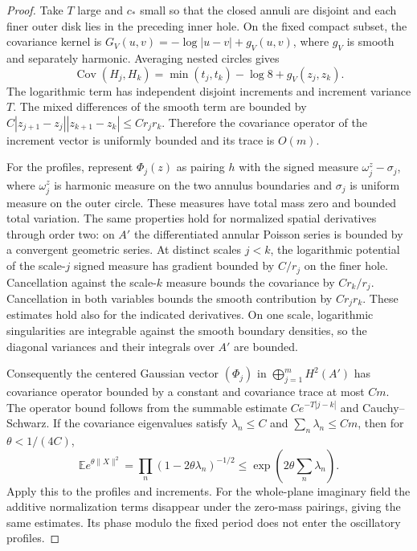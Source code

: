 \begin{proof}
Take $T$ large and $c_*$ small so that the closed annuli are disjoint and
each finer outer disk lies in the preceding inner hole.  On the fixed
compact subset, the covariance kernel is
$G_V(u,v)=-\log|u-v|+g_V(u,v)$, where $g_V$ is smooth and separately
harmonic.  Averaging nested circles gives
\[
 \operatorname{Cov}(H_j,H_k)
   =\min(t_j,t_k)-\log 8+g_V(z_j,z_k).
\]
The logarithmic term has independent disjoint increments and increment
variance $T$.  The mixed differences of the smooth term are bounded by
$C|z_{j+1}-z_j||z_{k+1}-z_k|\leq Cr_jr_k$.  Therefore the covariance
operator of the increment vector is uniformly bounded and its trace is
$O(m)$.

For the profiles, represent $\Phi_j(z)$ as pairing $h$ with the signed
measure $\omega_j^z-\sigma_j$, where $\omega_j^z$ is harmonic measure
on the two annulus boundaries and $\sigma_j$ is uniform measure on the
outer circle.  These measures have total mass zero and bounded total
variation.  The same properties hold for normalized spatial derivatives
through order two: on $A'$ the differentiated annular Poisson series is
bounded by a convergent geometric series.  At distinct scales $j<k$,
the logarithmic potential of the scale-$j$ signed measure has gradient
bounded by $C/r_j$ on the finer hole.  Cancellation against the scale-$k$
measure bounds the covariance by $Cr_k/r_j$.  Cancellation in both
variables bounds the smooth contribution by $Cr_jr_k$.  These estimates
hold also for the indicated derivatives.  On one scale, logarithmic
singularities are integrable against the smooth boundary densities, so
the diagonal variances and their integrals over $A'$ are bounded.

Consequently the centered Gaussian vector $(\Phi_j)$ in
$\bigoplus_{j=1}^m H^2(A')$ has covariance operator bounded by a constant
and covariance trace at most $Cm$.  The operator bound follows from
the summable estimate $Ce^{-T|j-k|}$ and Cauchy--Schwarz.  If the
covariance eigenvalues satisfy $\lambda_n\leq C$ and
$\sum_n\lambda_n\leq Cm$, then for $\theta<1/(4C)$,
\[
 \mathbb E e^{\theta\|X\|^2}
   =\prod_n(1-2\theta\lambda_n)^{-1/2}
   \leq\exp\!\left(2\theta\sum_n\lambda_n\right).
\]
Apply this to the profiles and increments.  For the whole-plane
imaginary field the additive normalization terms disappear under the
zero-mass pairings, giving the same estimates.  Its phase modulo the
fixed period does not enter the oscillatory profiles.
\end{proof}

